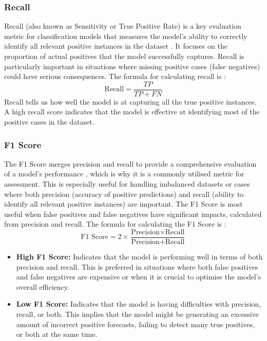 \documentclass[12pt, a4paper,oneside]{book}
\numberwithin{equation}{section}
\begin{document}
\subsubsection{Recall}

Recall (also known as Sensitivity or True Positive Rate) is a key evaluation metric for classification models that measures the model’s ability to correctly identify all relevant positive instances in the dataset \cite{bishop2006}. It focuses on the proportion of actual positives that the model successfully captures. Recall is particularly important in situations where missing positive cases (false negatives) could have serious
consequences. The formula for calculating recall is \cite{kumar2024} \cite{powers2011}:
\[\text{Recall} = \frac{TP}{TP + FN}\]
Recall tells us how well the model is at capturing all the true positive instances. A high recall score indicates that the model is effective at identifying most of the positive cases in the dataset.

\subsubsection{F1 Score}

The F1 Score merges precision and recall to provide a comprehensive evaluation of a model's performance \cite{powers2011}, which is why it is a commonly utilised metric for assessment. This is especially useful for handling imbalanced datasets or cases where both precision (accuracy of positive predictions) and recall (ability to identify all relevant positive instances) are important. The F1 Score is most useful when false positives and false negatives have significant impacts, calculated from precision and recall. The formula for calculating the F1 Score is \cite{kumar2024} \cite{powers2011}:
\[\text{F1 Score} = 2 \times \frac{\text{Precision} \times \text{Recall}}{\text{Precision} + \text{Recall}}\]
\begin{itemize}
    \item \textbf{High F1 Score:} Indicates that the model is performing well in terms of both precision and recall. This is preferred in situations where both false positives and false negatives are expensive or when it is crucial to optimise the model's overall efficiency.
    \item \textbf{Low F1 Score:} Indicates that the model is having difficulties with precision, recall, or both. This implies that the model might be generating an excessive amount of incorrect positive forecasts, failing to detect many true positives, or both at the same time.
\end{itemize}
\end{document}
